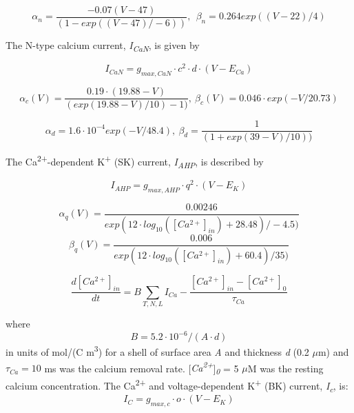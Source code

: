 \documentclass[12pt]{article}
\begin{document}
\begin{equation}
\alpha_{n}=\frac{-0.07(V-47)}{(1-exp((V-47)/-6))}, \ \  \beta_{n}=0.264exp((V-22)/4)
\end{equation}

The N-type calcium current, \textit{I}\textit{\textsubscript{CaN}}, is given by

\begin{equation}
I_{CaN}=g_{max, CaN} \cdot c^2 \cdot d \cdot (V-E_{Ca})
\end{equation}

\begin{equation}
\alpha_c(V)=\frac{0.19\cdot(19.88-V)}{(exp(19.88-V)/10)-1)}, \  \beta_c(V)=0.046 \cdot exp(-V/20.73)
\end{equation}

\begin{equation}
\alpha_d=1.6\cdot10^{-4}exp(-V/48.4) , \  \beta_d=\frac 1{(1+exp(39-V)/10))}
\end{equation}

The Ca\textsuperscript{2+}-dependent K\textsuperscript{+} (SK) current, \textit{I\textsubscript{AHP}}, is described by

\begin{equation}
I_{AHP} = g_{max, AHP} \cdot q^2 \cdot (V-E_K)
\end{equation}

\begin{equation}
\alpha_q(V)=\frac{0.00246}{exp(12\cdot log_{10}([Ca^{2+}]_{in})+28.48)/-4.5)}
\end{equation} 
\begin{equation}
\beta_q(V)=\frac{0.006}{exp(12\cdot log_{10}([Ca^{2+}]_{in})+60.4)/35)}
\end{equation}

\begin{equation}
\frac{d[Ca^{2+}]_{in}}{dt}=B\sum_{T, N, L}
I_{Ca}-\frac{[Ca^{2+}]_{in}-[Ca^{2+}]_0}{\tau_{Ca}}
\end{equation}

where
\begin{equation}
B = 5.2\cdot 10^{-6}/(A \cdot d)
\end{equation}
in units of mol/(C m\textsuperscript{3}) for a shell of
surface area \textit{A} and thickness \textit{d} (0.2 $\mu $m) and  $\tau_{Ca}=10$ ms was the calcium removal rate. [\textit{Ca\textsuperscript{2+}}]\textit{\textsubscript{0}} = 5 $\mu$M was the resting calcium concentration. 
The Ca\textsuperscript{2+} and voltage-dependent K\textsuperscript{+} (BK) current, \textit{I\textsubscript{c}}, is:
\begin{equation}
I_C=g_{max, c} \cdot o \cdot (V-E_K)
\end{equation}
\end{document}
